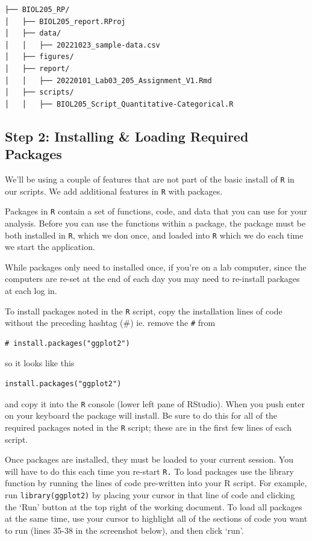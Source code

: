 \documentclass[
]{book}
\begin{document}
\begin{verbatim}
├── BIOL205_RP/
│   ├── BIOL205_report.RProj
│   ├── data/
│   │   ├── 20221023_sample-data.csv
│   ├── figures/
│   ├── report/
│   │   ├── 20220101_Lab03_205_Assignment_V1.Rmd
│   ├── scripts/
│   │   ├── BIOL205_Script_Quantitative-Categorical.R
\end{verbatim}

\hypertarget{step-2-installing-loading-required-packages}{%
\subsection*{Step 2: Installing \& Loading Required Packages}\label{step-2-installing-loading-required-packages}}

We'll be using a couple of features that are not part of the basic install of \texttt{R} in our scripts. We add additional features in \texttt{R} with packages.

Packages in \texttt{R} contain a set of functions, code, and data that you can use for your analysis. Before you can use the functions within a package, the package must be both installed in \texttt{R}, which we don once, and loaded into \texttt{R} which we do each time we start the application.

While packages only need to installed once, if you're on a lab computer, since the computers are re-set at the end of each day you may need to re-install packages at each log in.

To install packages noted in the \texttt{R} script, copy the installation lines of code without the preceding hashtag (\#) ie. remove the \texttt{\#} from

\begin{verbatim}
# install.packages("ggplot2")
\end{verbatim}

so it looks like this

\begin{verbatim}
install.packages("ggplot2")
\end{verbatim}

and copy it into the \texttt{R} console (lower left pane of RStudio). When you push enter on your keyboard the package will install. Be sure to do this for all of the required packages noted in the \texttt{R} script; these are in the first few lines of each script.

Once packages are installed, they must be loaded to your current session. You will have to do this each time you re-start \texttt{R.} To load packages use the library function by running the lines of code pre-written into your R script. For example, run \texttt{library(ggplot2)} by placing your cursor in that line of code and clicking the `Run' button at the top right of the working document. To load all packages at the same time, use your cursor to highlight all of the sections of code you want to run (lines 35-38 in the screenshot below), and then click `run'.
\end{document}
